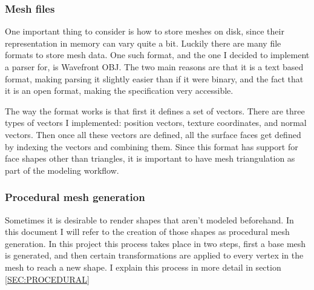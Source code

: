 \subsubsection{Mesh files}

One important thing to consider is how to store meshes on disk,
since their representation in memory can vary quite a bit.
Luckily there are many file formats to store mesh data.
One such format,
and the one I decided to implement a parser for,
is Wavefront OBJ.
The two main reasons are that it is a text based format,
making parsing it slightly easier than if it were binary,
and the fact that it is an open format,
making the specification very accessible.

The way the format works is that first it defines a set of vectors.
There are three types of vectors I implemented:
position vectors, texture coordinates, and normal vectors.
Then once all these vectors are defined,
all the surface faces get defined by indexing the vectors and combining them.
Since this format has support for face shapes other than triangles,
it is important to have mesh triangulation as part of the modeling workflow.

\subsubsection{Procedural mesh generation}


Sometimes it is desirable to render shapes that aren't modeled beforehand.
In this document I will refer to the creation of those shapes as procedural mesh generation.
In this project this process takes place in two steps,
first a base mesh is generated,
and then certain transformations are applied to every vertex in the mesh to reach a new shape.
I explain this process in more detail in section \ref{SEC:PROCEDURAL}
